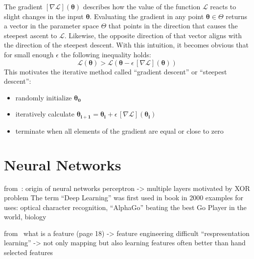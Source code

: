 The gradient $[\nabla\mathcal{L}](\boldsymbol{\theta})$ describes how the value of the function $\mathcal{L}$ reacts to slight changes in the input $\boldsymbol{\theta}$.
Evaluating the gradient in any point $\boldsymbol{\theta} \in \Theta$ returns a vector in the parameter space $\Theta$ that points in the direction that causes the steepest ascent to $\mathcal{L}$.
Likewise, the opposite direction of that vector aligns with the direction of the steepest descent.
With this intuition, it becomes obvious that for small enough $\epsilon$ the following inequality holds:
\[
    \mathcal{L}(\boldsymbol{\theta}) > \mathcal{L}(\boldsymbol{\theta} - \epsilon\,[\nabla\mathcal{L}](\boldsymbol{\theta}))
\]
This motivates the iterative method called \enquote{gradient descent} or \enquote{steepest descent}:
\begin{itemize}[noitemsep]
    \item randomly initialize $\boldsymbol{\theta_0}$
    \item iteratively calculate $\boldsymbol{\theta_{i+1}} = \boldsymbol{\theta_{i}} + \epsilon\,[\nabla\mathcal{L}](\boldsymbol{\theta_{i}})$
    \item terminate when all elements of the gradient are equal or close to zero
\end{itemize}

%

%



\section{Neural Networks}\label{sec:dnn}

from~\autocite{sonnet2022NeuralBoook}:
origin of neural networks
perceptron -> multiple layers motivated by XOR problem
The term \enquote{Deep Learning} was first used in book in 2000
examples for uses: optical character recognition, \enquote{AlphaGo} beating the best Go Player in the world, biology


from~\autocite{Goodfellow-et-al-2016}
what is a feature (page 18) -> feature engineering difficult
\enquote{respresentation learning} -> not only mapping but also learning features
often better than hand selected features

